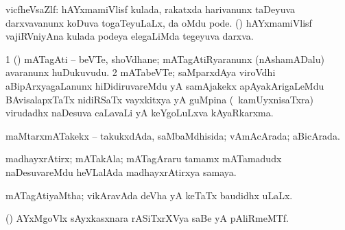 \bentry
{} 
\gl{\nA}
\bmng
vicfheVsaZlf: 
\banum
{} hAYxmamiVlisf kulada, rakatxda harivanunx taDeyuva darxvavanunx koDuva togaTeyuLaLx, \ame da oMdu pode. 
 (\kanmu) hAYxmamiVlisf vajiRVniyAna kulada podeya elegaLiMda tegeyuva darxva. 
\eanum
\emng
\eentry

\bentry
{} 
\gl{\nA}
\expl{}
\bmng
\bnum
\num{1} (\ca) mATagAti -- beVTe, shoVdhane; mATagAtiRyaranunx (nAshamADalu) avaranunx huDukuvudu. 
\num{2} mATabeVTe; saMparxdAya viroVdhi aBipArxyagaLanunx hiDidiruvareMdu yA samAjakekx apAyakArigaLeMdu BAvisalapxTaTx nidiRSaTx vayxkitxya yA guMpina (\kanmu\ kamUyxnisaTxra) virudadhx naDesuva caLavaLi yA keYgoLuLxva kAyaRkarxma. 
\enum
\emng
\eentry

\bentry
{} 
\gl{\gu}
\expl{}
\bmng
maMtarxmATakekx -- takukxdAda, saMbaMdhisida; vAmAcArada; aBicArada. 
\emng
\eentry

\bentry
{} 
\gl{\nA}
\expl{}
\bmng
madhayxrAtirx; mATakAla; mATagAraru tamamx mATamadudx naDesuvareMdu heVLalAda madhayxrAtirxya samaya. 
\emng
\eentry

\bentry
{} 
\gl{\gu}
\expl{}
\bmng
mATagAtiyaMtha; vikAravAda deVha yA keTaTx baudidhx uLaLx. 
\emng
\eentry

\bentry
{} 
\gl{\nA}
\expl{}
\bmng
(\ca) AYxMgoVlx sAyxkasxnara rASiTxrXVya saBe yA pAliRmeMTf. 
\emng
\eentry

